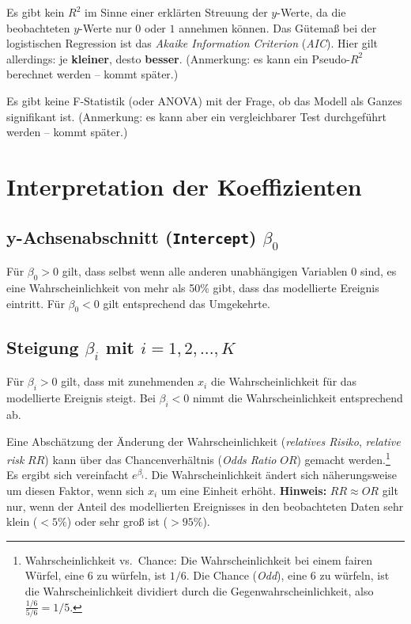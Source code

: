 \documentclass[12pt,ngerman,]{book}
\let\rmarkdownfootnote\footnote%
\def\footnote{\protect\rmarkdownfootnote}
\begin{document}
Es gibt kein \(R^2\) im Sinne einer erklärten Streuung der \(y\)-Werte,
da die beobachteten \(y\)-Werte nur \(0\) oder \(1\) annehmen können.
Das Gütemaß bei der logistischen Regression ist das \emph{Akaike
Information Criterion} (\emph{AIC}). Hier gilt allerdings: je
\textbf{kleiner}, desto \textbf{besser}. (Anmerkung: es kann ein
Pseudo-\(R^2\) berechnet werden -- kommt später.)

Es gibt keine F-Statistik (oder ANOVA) mit der Frage, ob das Modell als
Ganzes signifikant ist. (Anmerkung: es kann aber ein vergleichbarer Test
durchgeführt werden -- kommt später.)

\section{Interpretation der
Koeffizienten}\label{interpretation-der-koeffizienten}

\subsection{\texorpdfstring{y-Achsenabschnitt (\texttt{Intercept})
\(\beta_0\)}{y-Achsenabschnitt (Intercept) \textbackslash{}beta\_0}}\label{y-achsenabschnitt-intercept-beta_0}

Für \(\beta_0>0\) gilt, dass selbst wenn alle anderen unabhängigen
Variablen \(0\) sind, es eine Wahrscheinlichkeit von mehr als 50\% gibt,
dass das modellierte Ereignis eintritt. Für \(\beta_0<0\) gilt
entsprechend das Umgekehrte.

\subsection{\texorpdfstring{Steigung \(\beta_i\) mit
\(i=1,2,...,K\)}{Steigung \textbackslash{}beta\_i mit i=1,2,...,K}}\label{steigung-beta_i-mit-i12...k}

Für \(\beta_i>0\) gilt, dass mit zunehmenden \(x_i\) die
Wahrscheinlichkeit für das modellierte Ereignis steigt. Bei
\(\beta_i<0\) nimmt die Wahrscheinlichkeit entsprechend ab.

Eine Abschätzung der Änderung der Wahrscheinlichkeit (\emph{relatives
Risiko}, \emph{relative risk} \(RR\)) kann über das Chancenverhältnis
(\emph{Odds Ratio} \(OR\)) gemacht werden.\footnote{Wahrscheinlichkeit
  vs.~Chance: Die Wahrscheinlichkeit bei einem fairen Würfel, eine 6 zu
  würfeln, ist \(1/6\). Die Chance (\emph{Odd}), eine 6 zu würfeln, ist
  die Wahrscheinlichkeit dividiert durch die Gegenwahrscheinlichkeit,
  also \(\frac{1/6}{5/6}=1/5\).} Es ergibt sich vereinfacht
\(e^{\beta_i}\). Die Wahrscheinlichkeit ändert sich näherungsweise um
diesen Faktor, wenn sich \(x_i\) um eine Einheit erhöht.
\textbf{Hinweis:} \(RR\approx OR\) gilt nur, wenn der Anteil des
modellierten Ereignisses in den beobachteten Daten sehr klein (\(<5\%\))
oder sehr groß ist (\(>95\%\)).
\end{document}
